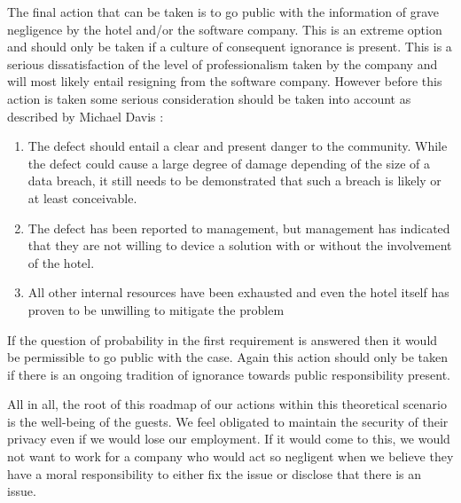 The final action that can be taken is to go public with the information of grave negligence by the hotel and/or the software company. This is an extreme option and should only be taken if a culture of consequent ignorance is present. This is a serious dissatisfaction of the level of professionalism taken by the company and will most likely entail resigning from the software company. However before this action is taken some serious consideration should be taken into account as described by Michael Davis \cite{whistleblowing_paradoxes}:
\begin{enumerate}
\item The defect should entail a clear and present danger to the community. While the defect could cause a large degree of damage depending of the size of a data breach, it still needs to be demonstrated that such a breach is likely or at least conceivable.
\item The defect has been reported to management, but management has indicated that they are not willing to device a solution with or without the involvement of the hotel.
\item All other internal resources have been exhausted and even the hotel itself has proven to be unwilling to mitigate the problem
\end{enumerate}
If the question of probability in the first requirement is answered then it would be permissible to go public with the case. Again this action should only be taken if there is an ongoing tradition of ignorance towards public responsibility present.

All in all, the root of this roadmap of our actions within this theoretical scenario is the well-being of the guests.  We feel obligated to maintain the security of their privacy even if we would lose our employment. If it would come to this, we would not want to work for a company who would act so negligent when we believe they have a moral responsibility to either fix the issue or disclose that there is an issue.
